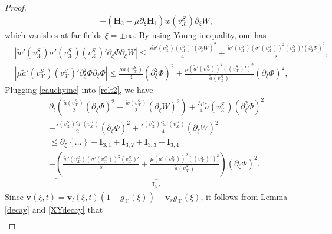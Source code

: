 \documentclass[12pt,reqno]{amsart}
\numberwithin{equation}{section}
\def\p{\partial}
\def\at{\tilde{a}}
\def\wt{\tilde{w}}
\def\vsx{v^S_{\mathcal{X}}}
\def\X{\mathcal{X}}
\begin{document}
\begin{proof}
\begin{align*}
		&-(\mathbf{H}_2-\mu\p_{\xi}\mathbf{H}_1)\wt(\vsx)\p_{\xi}W,
	\end{align*}
which vanishes at far fields $\xi=\pm\infty$.
	By using Young inequality, one has
	\begin{equation}\label{cauchyine}
		\begin{aligned}
			&|\wt'(\vsx)\sigma'(\vsx)(\vsx)'\p_{\xi}\Phi\p_{\xi}W|\leq \frac{s\wt'(\vsx)(\vsx)'(\p_{\xi}W)^2}{4}+\frac{\wt'(\vsx)(\sigma'(\vsx))^2(\vsx)'(\p_{\xi}\Phi)^2}{s},\\
			&|\mu\at'(\vsx)(\vsx)'\p^2_{\xi}\Phi\p_{\xi}\Phi|\leq \frac{\mu\at(\vsx)}{4}(\p^2_{\xi}\Phi)^2+\frac{\mu(\at'(\vsx))^2((\vsx)')^2}{\at(\vsx)}(\p_{\xi}\Phi)^2,
		\end{aligned}
	\end{equation}
	Plugging \eqref{cauchyine} into \eqref{relt2}, we have
	\begin{equation}\label{relt3}
		\begin{aligned}
			&\p_t\left(\frac{\at(\vsx)}{2}(\p_{\xi}\Phi)^2+\frac{\wt(\vsx)}{2}(\p_{\xi}W)^2\right)+\frac{3\mu}{4}\at(\vsx)(\p^2_{\xi}\Phi)^2\\
			&+\frac{s(\vsx)'\at'(\vsx)}{2}(\p_{\xi}\Phi)^2+\frac{s(\vsx)'\wt'(\vsx)}{4}(\p_{\xi}W)^2\\
			&\leq\p_{\xi}\left\{\dots\right\}+\mathbf{I}_{3,1}+\mathbf{I}_{3,2}+\mathbf{I}_{3,3}+\mathbf{I}_{3,4}\\
			&+\underbrace{\left(\frac{\wt'(\vsx)(\sigma'(\vsx))^2(\vsx)'}{s}+\frac{\mu(\at'(\vsx))^2((\vsx)')^2}{\at(\vsx)}\right)(\p_{\xi}\Phi)^2}_{\mathbf{I}_{3,5}}.
		\end{aligned}
	\end{equation}
	Since $\mathbf{\tilde{v}}(\xi,t)=\mathbf{v}_l(\xi,t)(1-g_{\X}(\xi))+\mathbf{v}_rg_{\X}(\xi)$, it follows from Lemma \ref{decay} and \ref{XYdecay} that
		\begin{align}\label{vsx'decay}

\end{align}
\end{proof}
\end{document}
